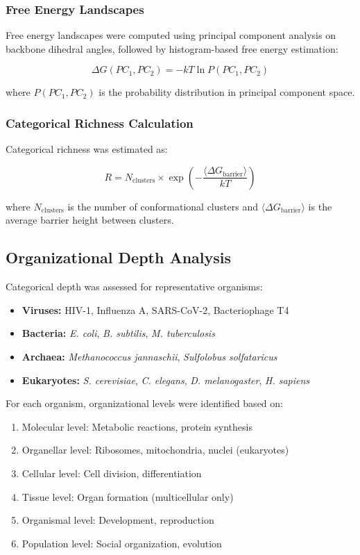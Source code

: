 \documentclass[11pt]{article}
\begin{document}
\subsubsection{Free Energy Landscapes}

Free energy landscapes were computed using principal component analysis on backbone dihedral angles, followed by histogram-based free energy estimation:

\begin{equation}
\Delta G(PC_1, PC_2) = -kT \ln P(PC_1, PC_2)
\end{equation}

where $P(PC_1, PC_2)$ is the probability distribution in principal component space.

\subsubsection{Categorical Richness Calculation}

Categorical richness was estimated as:

\begin{equation}
R = N_{\text{clusters}} \times \exp\left(-\frac{\langle \Delta G_{\text{barrier}} \rangle}{kT}\right)
\end{equation}

where $N_{\text{clusters}}$ is the number of conformational clusters and $\langle \Delta G_{\text{barrier}} \rangle$ is the average barrier height between clusters.

\subsection{Organizational Depth Analysis}

Categorical depth was assessed for representative organisms:

\begin{itemize}
\item \textbf{Viruses:} HIV-1, Influenza A, SARS-CoV-2, Bacteriophage T4
\item \textbf{Bacteria:} \textit{E. coli}, \textit{B. subtilis}, \textit{M. tuberculosis}
\item \textbf{Archaea:} \textit{Methanococcus jannaschii}, \textit{Sulfolobus solfataricus}
\item \textbf{Eukaryotes:} \textit{S. cerevisiae}, \textit{C. elegans}, \textit{D. melanogaster}, \textit{H. sapiens}
\end{itemize}

For each organism, organizational levels were identified based on:
\begin{enumerate}
\item Molecular level: Metabolic reactions, protein synthesis
\item Organellar level: Ribosomes, mitochondria, nuclei (eukaryotes)
\item Cellular level: Cell division, differentiation
\item Tissue level: Organ formation (multicellular only)
\item Organismal level: Development, reproduction
\item Population level: Social organization, evolution
\end{enumerate}
\end{document}
